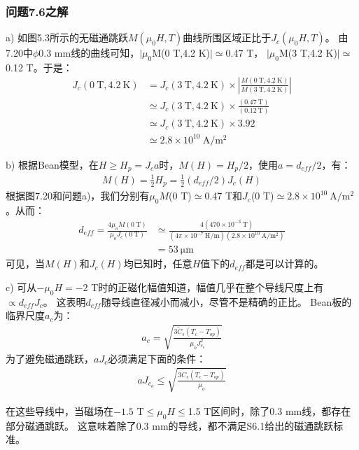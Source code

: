 \subsubsection{问题7.6之解}
a) 如图5.3所示的无磁通跳跃$M(\mu_0 H,T)$曲线所围区域正比于$J_c(\mu_0 H,T)$。
由7.20中$\phi$0.3 mm线的曲线可知，$|\mu_0$M(0 T,4.2 K)$|\simeq$0.47 T，
$|\mu_0$M(3 T,4.2 K)$|\simeq$0.12 T。于是：
\begin{align*}%
J_c(0\ \mathrm{T},4.2\ \mathrm{K})&=J_c(3\ \mathrm{T},4.2\ \mathrm{K})\times\left| \frac{M(0\ \mathrm{T},4.2\ \mathrm{K})}{M(3\ \mathrm{T},4.2\ \mathrm{K})}\right| \\ 
&\simeq J_c(3\ \mathrm{T},4.2\ \mathrm{K})\times\frac{(0.47\ \mathrm{T})}{(0.12\ \mathrm{T})}\\
&\simeq J_c(3\ \mathrm{T},4.2\ \mathrm{K})\times 3.92 \\
&\simeq 2.8\times 10^{10}\ \mathrm{A/m^2}
\end{align*}

b) 根据Bean模型，在$H\ge H_p=J_c a$时，$M(H)=H_p/2$，使用$a=d_{eff}/2$，有：
\begin{align*}%
M(H)=\frac{1}{2}H_p=\frac{1}{2}(d_{eff}/2)J_c(H)
\end{align*}
根据图7.20和问题a)，我们分别有$\mu_0 M$(0 T)$\simeq$0.47 T和$J_c$(0 T)$\simeq 2.8\times 10^{10}\ \mathrm{ A/m^2}$。从而：
\begin{align*}%
d_{eff}=\frac{4\mu_oM(0\ \mathrm{T})}{\mu_oJ_c(0\ \mathrm{T})}&\simeq\frac{4(470\times 10^{-3}\ \mathrm{T})}{(4\pi\times 10^{-7}\ \mathrm{H/m})(2.8\times10^{10}\ \mathrm{A/m^2})}\\
&=53\ \mathrm{\mu m}
\end{align*}
可见，当$M(H)$和$J_c(H)$均已知时，任意$H$值下的$d_{eff}$都是可以计算的。

c) 可从$-\mu_0 H=-$2 T时的正磁化幅值知道，幅值几乎在整个导线尺度上有$\propto d_{eff} J_c$。
这表明$d_{eff}$随导线直径减小而减小，尽管不是精确的正比。
Bean板的临界尺度$a_c$为：
\begin{align*}%
a_c=\sqrt{\frac{3\tilde{C}_s(T_c-T_{op})}{\mu_oJ_{c_o}^{2}}} \tag{5.40}
\end{align*}
为了避免磁通跳跃，$aJ_c$必须满足下面的条件：
\begin{align*}%
aJ_{c_o}\leq\sqrt{\frac{3\tilde{C}_s(T_c-T_{op})}{\mu_o}} \tag{S6.1}
\end{align*}

在这些导线中，当磁场在$-1.5$ T$\le \mu_0 H\le$1.5 T区间时，除了0.3 mm线，都存在部分磁通跳跃。
这意味着除了0.3 mm的导线，都不满足S6.1给出的磁通跳跃标准。

